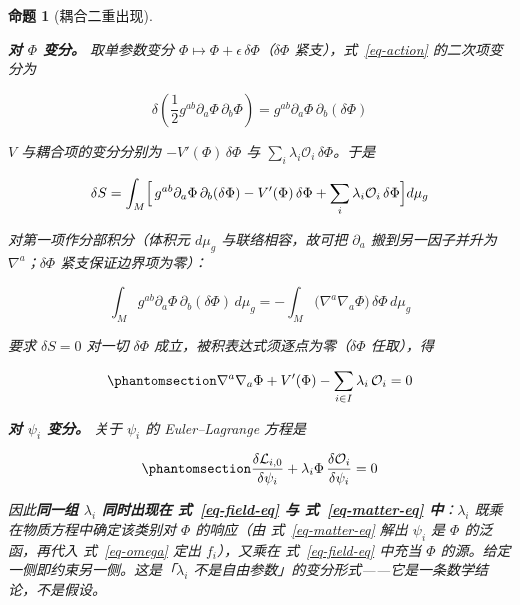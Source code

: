 \documentclass[
  chinese,
  a4paper,
  UTF8,
  12pt,
  oneside,
  openany]{ctexbook}
\theoremstyle{plain}
\theoremstyle{plain}
\theoremstyle{plain}
\newtheorem{proposition}{命题}[chapter]
\theoremstyle{definition}
\theoremstyle{plain}
\theoremstyle{plain}
\theoremstyle{remark}
\begin{document}
\begin{proposition}[耦合二重出现]\protect\hypertarget{prp-double-coupling}{}\label{prp-double-coupling}

\textbf{对 \(\Phi\) 变分。} 取单参数变分
\(\Phi\mapsto\Phi+\epsilon\,\delta\Phi\)（\(\delta\Phi\)
紧支），式~\ref{eq-action} 的二次项变分为

\[
\delta\!\left(\frac{1}{2}g^{ab}\partial_{a}\Phi\,\partial_{b}\Phi\right)
=g^{ab}\partial_{a}\Phi\,\partial_{b}(\delta\Phi)
\]

\(V\) 与耦合项的变分分别为 \(-V'(\Phi)\,\delta\Phi\) 与
\(\sum_i\lambda_i\mathcal{O}_i\,\delta\Phi\)。于是

\[
\delta S=\int_{M}\Bigl[\,g^{ab}\partial_{a}\Phi\,\partial_{b}(\delta\Phi)-V'(\Phi)\,\delta\Phi+\sum_{i}\lambda_i\mathcal{O}_i\,\delta\Phi\Bigr]d\mu_g
\]

对第一项作分部积分（体积元 \(d\mu_g\) 与联络相容，故可把
\(\partial_{a}\) 搬到另一因子并升为 \(\nabla^{a}\)；\(\delta\Phi\)
紧支保证边界项为零）：

\[
\int_{M}g^{ab}\partial_{a}\Phi\,\partial_{b}(\delta\Phi)\,d\mu_g
=-\int_{M}\bigl(\nabla^{a}\nabla_{a}\Phi\bigr)\,\delta\Phi\,d\mu_g
\]

要求 \(\delta S=0\) 对一切 \(\delta\Phi\)
成立，被积表达式须逐点为零（\(\delta\Phi\) 任取），得

\begin{equation}\protect\phantomsection\label{eq-field-eq}{
\nabla^{a}\nabla_{a}\Phi + V'(\Phi) - \sum_{i\in I}\lambda_i\,\mathcal{O}_i = 0
}\end{equation}

\textbf{对 \(\psi_i\) 变分。} 关于 \(\psi_i\) 的 Euler--Lagrange 方程是

\begin{equation}\protect\phantomsection\label{eq-matter-eq}{
\frac{\delta\mathcal{L}_{i,0}}{\delta\psi_i}+\lambda_i\Phi\,\frac{\delta\mathcal{O}_i}{\delta\psi_i}=0
}\end{equation}

因此\textbf{同一组 \(\lambda_i\) 同时出现在 式~\ref{eq-field-eq} 与
式~\ref{eq-matter-eq} 中}：\(\lambda_i\) 既乘在物质方程中确定该类别对
\(\Phi\) 的响应（由 式~\ref{eq-matter-eq} 解出 \(\psi_i\) 是 \(\Phi\)
的泛函，再代入 式~\ref{eq-omega} 定出 \(f_i\)），又乘在
式~\ref{eq-field-eq} 中充当 \(\Phi\)
的源。给定一侧即约束另一侧。这是「\(\lambda_i\)
不是自由参数」的变分形式------它是一条数学结论，不是假设。

\end{proposition}
\end{document}
